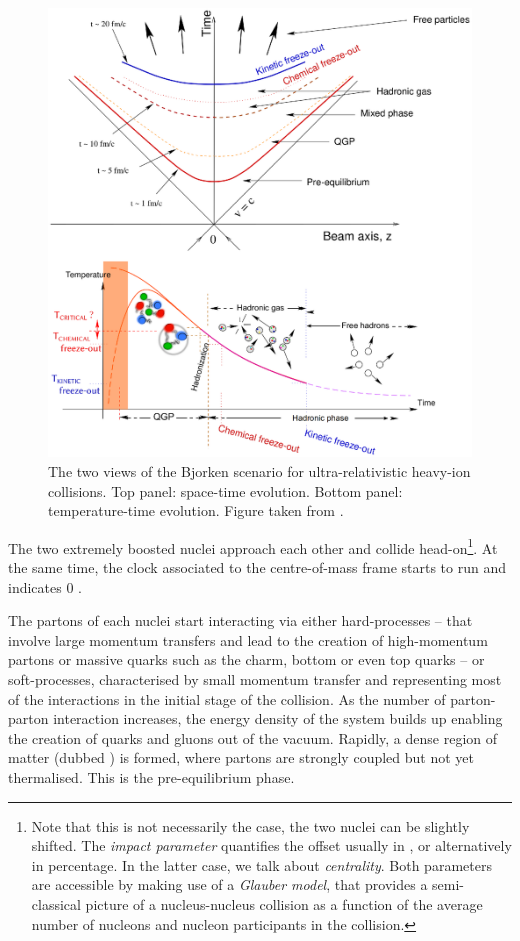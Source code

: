\begin{figure}[h]
	\centering
	\includegraphics[width=\textwidth]{Figs/Chapter2/Schema-BjorkenScenario.eps}
	\caption{The two views of the Bjorken scenario for ultra-relativistic heavy-ion collisions. Top panel: space-time evolution. Bottom panel: temperature-time evolution. Figure taken from \cite{maireTwoViewsBjorken2011}.}
	\label{fig:QGPEvol}
\end{figure}

The two extremely boosted nuclei approach each other and collide head-on\footnote{Note that this is not necessarily the case, the two nuclei can be slightly shifted. The \textit{impact parameter} quantifies the offset usually in \fm, or alternatively in percentage. In the latter case, we talk about \textit{centrality}. Both parameters are accessible by making use of a \textit{Glauber model}, that provides a semi-classical picture of a nucleus-nucleus collision as a function of the average number of nucleons and nucleon participants in the collision.}. At the same time, the clock associated to the centre-of-mass frame starts to run and indicates 0 \fmC. 

The partons of each nuclei start interacting via either hard-processes -- that involve large momentum transfers and lead to the creation of high-momentum partons or massive quarks such as the charm, bottom or even top quarks -- or soft-processes, characterised by small momentum transfer and representing most of the interactions in the initial stage of the collision. As the number of parton-parton interaction increases, the energy density of the system builds up enabling the creation of quarks and gluons out of the vacuum. Rapidly, a dense region of matter (dubbed ) is formed, where partons are strongly coupled but not yet thermalised. This is the pre-equilibrium phase.

